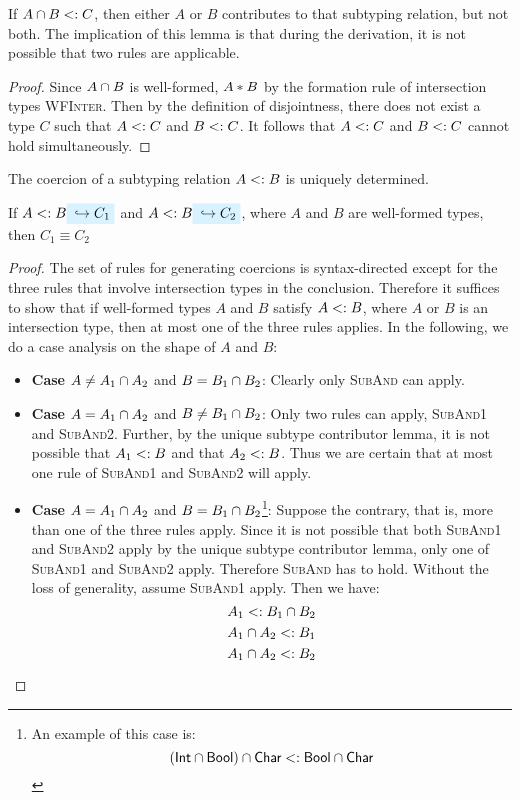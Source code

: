 \documentclass[preprint]{sigplanconf}
\begin{document}
If $A \cap B <: C$, then either $A$ or $B$ contributes to that subtyping relation, but not both. The implication of this lemma is that during the derivation, it is not possible that two rules are applicable.

\newcommand{\wfinterlabel}{\textsc{WFInter}}

\begin{proof}
Since $A \cap B$ is well-formed, $A * B$ by the formation rule of intersection types \wfinterlabel. Then by the definition of disjointness, there does not exist a type $C$ such that $A <: C$ and $B <: C$. It follows that $A <: C$ and $B <: C$ cannot hold simultaneously.
\end{proof}

The coercion of a subtyping relation $A <: B$ is uniquely determined.

\begin{lemma} \label{unique-coercion}
If $A \subtype B \yields {C_1}$ and $A \subtype B \yields {C_2}$, where $A$ and $B$ are well-formed types, then $C_1 \equiv C_2$
\end{lemma}

\begin{proof}
The set of rules for generating coercions is syntax-directed except for the three rules that involve intersection types in the conclusion. Therefore it suffices to show that if well-formed types $A$ and $B$ satisfy $A <: B$, where $A$ or $B$ is an intersection type, then at most one of the three rules applies. In the following, we do a case analysis on the shape of $A$ and $B$:

\begin{itemize}
  \item \textbf{Case} $A \neq A_1 \cap A_2$ and $B = B_1 \cap B_2$: Clearly only \textsc{SubAnd} can apply.
  \item \textbf{Case} $A = A_1 \cap A_2$ and $B \neq B_1 \cap B_2$: Only two rules can apply, \textsc{SubAnd1} and \textsc{SubAnd2}. Further, by the unique subtype contributor lemma, it is not possible that $A_1 <: B$ and that $A_2 <: B$. Thus we are certain that at most one rule of \textsc{SubAnd1} and \textsc{SubAnd2} will apply.
  \item \textbf{Case} $A = A_1 \cap A_2$ and $B = B_1 \cap B_2$\footnote{An example of this case is:
    \[ (\textsf{Int} \cap \textsf{Bool}) \cap \textsf{Char} <: \textsf{Bool} \cap \textsf{Char} \]}: Suppose the contrary, that is, more than one of the three rules apply. Since it is not possible that both \textsc{SubAnd1} and \textsc{SubAnd2} apply by the unique subtype contributor lemma, only one of \textsc{SubAnd1} and \textsc{SubAnd2} apply. Therefore \textsc{SubAnd} has to hold. Without the loss of generality, assume \textsc{SubAnd1} apply. Then we have:
  \[ A_1 <: B_1 \cap B_2 \]
  \[ A_1 \cap A_2 <: B_1 \]
  \[ A_1 \cap A_2 <: B_2 \]
\end{itemize}

\end{proof}
\end{document}
